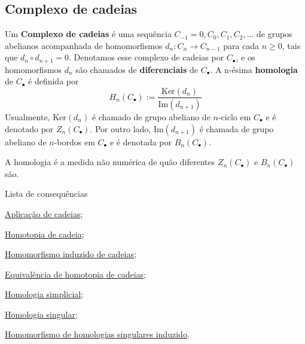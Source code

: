 \subsection{Complexo de cadeias}
\label{complexo-de-cadeias-def}
\begin{defi}
	Um \textbf{Complexo de cadeias} é uma sequência $C_{-1}=0,C_0,C_1, C_2,...$ de grupos abelianos acompanhada de homomorfismos $d_n:C_n\rightarrow C_{n-1}$ para cada $n\ge 0$, tais que $d_{n}\circ d_{n+1}=0$. Denotamos esse complexo de cadeias por $C_{\bullet}$, e os homomorfismos $d_n$ são chamados de \textbf{diferenciais} de $C_\bullet$. A n-ésima \textbf{homologia} de $C_\bullet$ é definida por
    \[H_n(C_\bullet):=\frac{\text{Ker}(d_n)}{\text{Im}(d_{n+1})}\]
    Usualmente, $\text{Ker}(d_n)$ é chamado de grupo abeliano de $n$-ciclo em $C_\bullet$ e é denotado por $Z_n(C_\bullet)$. Por outro lado, $\text{Im}(d_{n+1})$ é chamada de grupo abeliano de $n$-bordos em $C_\bullet$ e é denotada por $B_n(C_\bullet)$.
\end{defi}

A homologia é a medida não numérica de quão diferentes $Z_n(C_\bullet)$ e $B_n(C_\bullet)$ são.

\begin{titlemize}{Lista de consequências}
    \item \hyperref[aplicacao-de-cadeias-def]{Aplicação de cadeias};\\
    \item \hyperref[homotopia-de-cadeias-def]{Homotopia de cadeia};\\
    \item \hyperref[homomorfismo-induzido-de-cadeias-prop]{Homomorfismo induzido de cadeias};\\
    \item \hyperref[equivalencia-de-homotopia-de-cadeias-def]{Equivalência de homotopia de cadeias};\\
    \item \hyperlink{homologia-simplicial-def}{Homologia simplicial};\\
    \item \hyperref[homologia-singular-def]{Homologia singular};\\
    \item \hyperref[homomorfismo-de-homologias-singulares-induzido-prop]{Homomorfismo de homologias singulares induzido}.
\end{titlemize}
